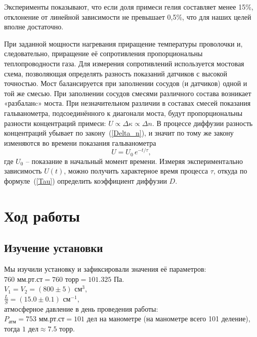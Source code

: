 \documentclass[a4paper]{article}
\begin{document}
    Эксперименты показывают, что если доля примеси гелия составляет менее 15\%, отклонение от линейной зависимости не превышает 0,5\%, что для наших целей вполне достаточно.


    При заданной мощности нагревания приращение температуры  проволочки и, следовательно, приращение её сопротивления пропорциональны теплопроводности газа. Для измерения сопротивлений используется мостовая схема, позволяющая определять разность показаний датчиков с высокой точностью. Мост балансируется при заполнении сосудов (и датчиков) одной и той же смесью. При заполнении сосудов смесями различного состава возникает «разбаланc» моста. При незначительном различии в составах смесей показания гальванометра, подсоединённого к диагонали моста, будут пропорциональны разности концентраций примеси: $U\propto\Delta \kappa \propto \Delta n$. В процессе диффузии разность концентраций убывает по закону~(\ref{Delta_n}), и значит по тому же закону изменяются во времени показания гальванометра
    \begin{equation}
        U = U_0 \, e^{-t / \tau},
    \end{equation}
    где $U_0$ -- показание в начальный момент времени. Измеряя экспериментально зависимость $U(t)$, можно получить характерное время процесса $\tau$, откуда по формуле~(\ref{Tau}) определить коэффициент диффузии $D$.

\section{Ход работы}

\subsection{Изучение установки}

Мы изучили установку и зафиксировали значения её параметров:\\

$760 \text{ мм.рт.ст} = 760 \text{ торр} = 101.325 \text{ Па}$.\\

$V_1 = V_2 = (800 \pm 5) \text{ см}^3$,\\

$\frac{L}{S} = (15.0 \pm 0.1) \text{ см}^{-1}$,\\

атмосферное давление в день проведения работы: $P_\text{атм} = 753 \text{ мм.рт.ст} = 101 \text{ дел на манометре}$ (на манометре всего 101 деление), тогда $1 \text{ дел} \approx 7.5 \text{ торр}.$ \\
\end{document}

